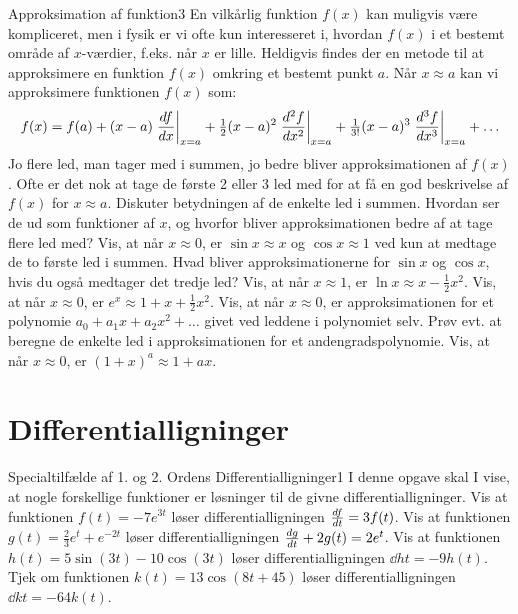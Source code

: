 \begin{opgave}{Approksimation af funktion}{3}
  En vilkårlig funktion $f(x)$ kan muligvis være kompliceret, men i
  fysik er vi ofte kun interesseret i, hvordan $f(x)$ i et bestemt
  område af $x$-værdier, f.eks. når $x$ er lille. Heldigvis findes der
  en metode til at approksimere en funktion $f(x)$ omkring et bestemt
  punkt $a$. Når $x \approx a$ kan vi approksimere funktionen $f(x)$
  som:
  \[
  f(x) = f(a) + (x-a) \left.{d{f} \over d{x}}\right|_{x=a}
  + \tfrac{1}{2} (x-a)^2 \left.{d^2{f} \over d{x}^2}\right|_{x=a}
  + \tfrac{1}{3!} (x-a)^3 \left.\frac{d^3f}{dx^3}\right|_{x=a}
  + \ldots
  \]
  Jo flere led, man tager med i summen, jo bedre bliver
  approksimationen af $f(x)$. Ofte er det nok at tage de første 2
  eller 3 led med for at få en god beskrivelse af $f(x)$ for $x
  \approx a$.
  \opg Diskuter betydningen af de enkelte led i summen. Hvordan ser de
  ud som funktioner af $x$, og hvorfor bliver approksimationen bedre
  af at tage flere led med?
  \opg Vis, at når $x \approx 0$, er $\sin x \approx x$ og $\cos x
  \approx 1$ ved kun at medtage de to første led i summen. Hvad bliver
  approksimationerne for $\sin x$ og $\cos x$, hvis du også medtager det
  tredje led?
  \opg Vis, at når $x \approx 1$, er $\ln x \approx x -
  \tfrac{1}{2} x^2$.
  \opg Vis, at når $x \approx 0$, er $e^x \approx 1 + x + \tfrac{1}{2}
  x^2$.
  \opg Vis, at når $x \approx 0$, er approksimationen for et polynomie
  $a_0 + a_1 x + a_2 x^2 + \ldots$ givet ved leddene i polynomiet
  selv. Prøv evt. at beregne de enkelte led i approksimationen for et
  andengradspolynomie.
  \opg Vis, at når $x \approx 0$, er $(1 + x)^a \approx 1 + ax$.
\end{opgave}

\section*{Differentialligninger}

\begin{opgave}{Specialtilfælde af 1. og 2. Ordens Differentialligninger}{1}
I denne opgave skal I vise, at nogle forskellige funktioner er løsninger til de givne differentialligninger.
\opg Vis at funktionen $f(t) = -7e^{3t}$ løser differentialligningen ${d{f} \over d{t}} = 3 f(t)$.
\opg Vis at funktionen $g(t) = \frac{2}{3}e^t + e^{-2t}$ løser differentialligningen ${d{g} \over d{t}} +2g(t) = 2e^t$.
\opg Vis at funktionen $h(t) = 5 \sin (3t) - 10 \cos(3t)$ løser differentialligningen $\dd{h}{t} = -9h(t)$.
\opg Tjek om funktionen $k(t) = 13 \cos (8t + 45)$ løser differentialligningen $\dd{k}{t} = -64k(t)$.
\end{opgave}

